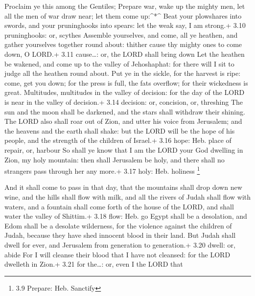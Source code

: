  Proclaim ye this among the Gentiles; Prepare war, wake up
the mighty men, let all the men of war draw near; let them come
up:\^{}*\^{}  Beat your plowshares into swords, and your
pruninghooks into spears: let the weak say, I am strong.+ 3.10
pruninghooks: or, scythes  Assemble yourselves, and come,
all ye heathen, and gather yourselves together round about: thither
cause thy mighty ones to come down, O LORD.+ 3.11 cause\ldots: or, the
LORD shall bring down  Let the heathen be wakened, and come
up to the valley of Jehoshaphat: for there will I sit to judge all the
heathen round about.  Put ye in the sickle, for the harvest
is ripe: come, get you down; for the press is full, the fats overflow;
for their wickedness is great.  Multitudes, multitudes in
the valley of decision: for the day of the LORD is near in the valley of
decision.+ 3.14 decision: or, concision, or, threshing  The
sun and the moon shall be darkened, and the stars shall withdraw their
shining.  The LORD also shall roar out of Zion, and utter
his voice from Jerusalem; and the heavens and the earth shall shake: but
the LORD will be the hope of his people, and the strength of the
children of Israel.+ 3.16 hope: Heb. place of repair, or, harbour
 So shall ye know that I am the LORD your God dwelling in
Zion, my holy mountain: then shall Jerusalem be holy, and there shall no
strangers pass through her any more.+ 3.17 holy: Heb. holiness
\footnote{3.9 Prepare: Heb. Sanctify}

 And it shall come to pass in that day, that the mountains
shall drop down new wine, and the hills shall flow with milk, and all
the rivers of Judah shall flow with waters, and a fountain shall come
forth of the house of the LORD, and shall water the valley of Shittim.+
3.18 flow: Heb. go  Egypt shall be a desolation, and Edom
shall be a desolate wilderness, for the violence against the children of
Judah, because they have shed innocent blood in their land.
 But Judah shall dwell for ever, and Jerusalem from
generation to generation.+ 3.20 dwell: or, abide  For I
will cleanse their blood that I have not cleansed: for the LORD dwelleth
in Zion.+ 3.21 for the\ldots: or, even I the LORD that
